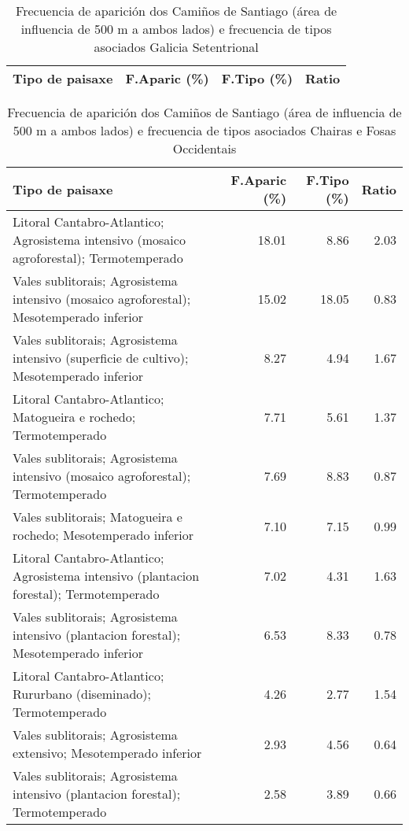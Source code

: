 \begin{table}[p]
\centering
\caption{Frecuencia de aparición dos Camiños de Santiago (área de influencia de 500 m a ambos lados) e frecuencia de tipos asociados Galicia Setentrional} 
\label{vcamino10}
\begin{tabular}{lrrr}
  \hline
Tipo de paisaxe & F.Aparic (\%) & F.Tipo (\%) & Ratio \\ 
  \hline
\hline
\end{tabular}
\end{table}
\begin{table}[p]
\centering
\caption{Frecuencia de aparición dos Camiños de Santiago (área de influencia de 500 m a ambos lados) e frecuencia de tipos asociados Chairas e Fosas Occidentais} 
\label{vcamino11}
\begin{tabular}{lrrr}
  \hline
Tipo de paisaxe & F.Aparic (\%) & F.Tipo (\%) & Ratio \\ 
  \hline
Litoral Cantabro-Atlantico; Agrosistema intensivo (mosaico agroforestal); Termotemperado & 18.01 & 8.86 & 2.03 \\ 
  Vales sublitorais; Agrosistema intensivo (mosaico agroforestal); Mesotemperado inferior & 15.02 & 18.05 & 0.83 \\ 
  Vales sublitorais; Agrosistema intensivo (superficie de cultivo); Mesotemperado inferior & 8.27 & 4.94 & 1.67 \\ 
  Litoral Cantabro-Atlantico; Matogueira e rochedo; Termotemperado & 7.71 & 5.61 & 1.37 \\ 
  Vales sublitorais; Agrosistema intensivo (mosaico agroforestal); Termotemperado & 7.69 & 8.83 & 0.87 \\ 
  Vales sublitorais; Matogueira e rochedo; Mesotemperado inferior & 7.10 & 7.15 & 0.99 \\ 
  Litoral Cantabro-Atlantico; Agrosistema intensivo (plantacion forestal); Termotemperado & 7.02 & 4.31 & 1.63 \\ 
  Vales sublitorais; Agrosistema intensivo (plantacion forestal); Mesotemperado inferior & 6.53 & 8.33 & 0.78 \\ 
  Litoral Cantabro-Atlantico; Rururbano (diseminado); Termotemperado & 4.26 & 2.77 & 1.54 \\ 
  Vales sublitorais; Agrosistema extensivo; Mesotemperado inferior & 2.93 & 4.56 & 0.64 \\ 
  Vales sublitorais; Agrosistema intensivo (plantacion forestal); Termotemperado & 2.58 & 3.89 & 0.66 \\ 

\end{tabular}
\end{table}
